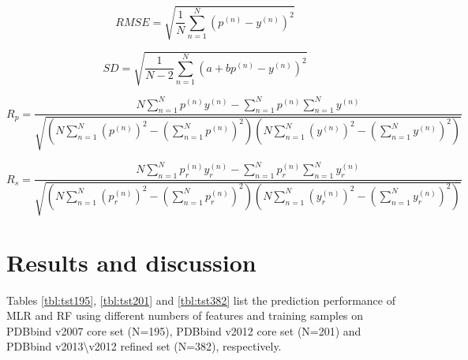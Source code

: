 \documentclass[journal=jacsat,manuscript=article]{achemso}
\begin{document}
\begin{equation}
RMSE = \sqrt{\frac{1}{N}\sum_{n=1}^N(p^{(n)}-y^{(n)})^2}
\label{eqn:rmse}
\end{equation}

\begin{equation}
SD = \sqrt{\frac{1}{N-2}\sum_{n=1}^N(a+bp^{(n)}-y^{(n)})^2}
\label{eqn:sd}
\end{equation}

\begin{equation}
R_p = \frac{N\sum_{n=1}^Np^{(n)}y^{(n)}-\sum_{n=1}^Np^{(n)}\sum_{n=1}^Ny^{(n)}}{\sqrt{(N\sum_{n=1}^N(p^{(n)})^2-(\sum_{n=1}^Np^{(n)})^2)(N\sum_{n=1}^N(y^{(n)})^2-(\sum_{n=1}^Ny^{(n)})^2)}}
\label{eqn:rp}
\end{equation}

\begin{equation}
R_s = \frac{N\sum_{n=1}^Np_r^{(n)}y_r^{(n)}-\sum_{n=1}^Np_r^{(n)}\sum_{n=1}^Ny_r^{(n)}}{\sqrt{(N\sum_{n=1}^N(p_r^{(n)})^2-(\sum_{n=1}^Np_r^{(n)})^2)(N\sum_{n=1}^N(y_r^{(n)})^2-(\sum_{n=1}^Ny_r^{(n)})^2)}}
\label{eqn:rs}
\end{equation}

\section{Results and discussion}

Tables \ref{tbl:tst195}, \ref{tbl:tst201} and \ref{tbl:tst382} list the prediction performance of MLR and RF using different numbers of features and training samples on PDBbind v2007 core set (N=195), PDBbind v2012 core set (N=201) and PDBbind v2013\textbackslash v2012 refined set (N=382), respectively.
\end{document}
